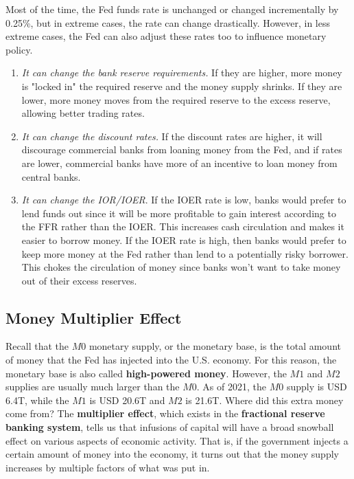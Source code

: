 \documentclass{article}
\begin{document}
    \begin{definition}
      \label{def:other-monetary-policy-tools}
      Most of the time, the Fed funds rate is unchanged or changed incrementally by 0.25\%, but in extreme cases, the rate can change drastically. However, in less extreme cases, the Fed can also adjust these rates too to influence monetary policy. 
      \begin{enumerate}
        \item \textit{It can change the bank reserve requirements.} If they are higher, more money is "locked in" the required reserve and the money supply shrinks. If they are lower, more money moves from the required reserve to the excess reserve, allowing better trading rates. 
        \item \textit{It can change the discount rates.} If the discount rates are higher, it will discourage commercial banks from loaning money from the Fed, and if rates are lower, commercial banks have more of an incentive to loan money from central banks. 
        \item \textit{It can change the IOR/IOER}. If the IOER rate is low, banks would prefer to lend funds out since it will be more profitable to gain interest according to the FFR rather than the IOER. This increases cash circulation and makes it easier to borrow money. If the IOER rate is high, then banks would prefer to keep more money at the Fed rather than lend to a potentially risky borrower. This chokes the circulation of money since banks won't want to take money out of their excess reserves. 
      \end{enumerate}
    \end{definition}

  \subsection{Money Multiplier Effect}

    Recall that the $M0$ monetary supply, or the monetary base, is the total amount of money that the Fed has injected into the U.S. economy. For this reason, the monetary base is also called \textbf{high-powered money}. However, the $M1$ and $M2$ supplies are usually much larger than the $M0$. As of 2021, the $M0$ supply is USD 6.4T, while the $M1$ is USD 20.6T and $M2$ is 21.6T. Where did this extra money come from? The \textbf{multiplier effect}, which exists in the \textbf{fractional reserve banking system}, tells us that infusions of capital will have a broad snowball effect on various aspects of economic activity. That is, if the government injects a certain amount of money into the economy, it turns out that the money supply increases by multiple factors of what was put in.
\end{document}
